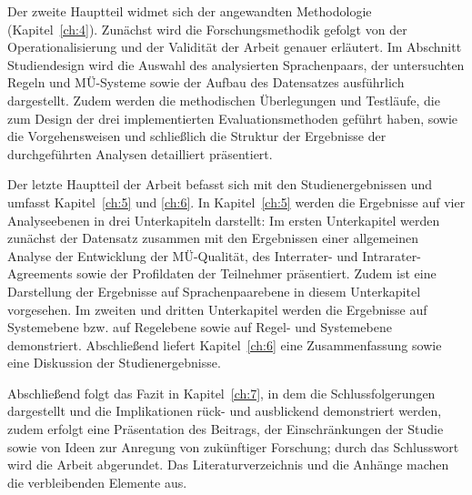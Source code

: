 Der zweite Hauptteil widmet sich der angewandten Methodologie (Kapitel~\ref{ch:4}). Zunächst wird die Forschungsmethodik gefolgt von der Operationalisierung und der Validität der Arbeit genauer erläutert. Im Abschnitt Studiendesign wird die Auswahl des analysierten Sprachenpaars, der untersuchten Regeln und MÜ-Sys\-te\-me sowie der Aufbau des Datensatzes ausführlich dargestellt. Zudem werden die methodischen Überlegungen und Testläufe, die zum Design der drei implementierten Evaluationsmethoden geführt haben, sowie die Vorgehensweisen und schließlich die Struktur der Ergebnisse der durchgeführten Analysen detailliert präsentiert.

Der letzte Hauptteil der Arbeit befasst sich mit den Studienergebnissen und umfasst Kapitel~\ref{ch:5} und \ref{ch:6}. In Kapitel~\ref{ch:5} werden die Ergebnisse auf vier Analyseebenen in drei Unterkapiteln darstellt: Im ersten Unterkapitel werden zunächst der Datensatz zusammen mit den Ergebnissen einer allgemeinen Analyse der Entwicklung der MÜ-Qualität, des Interrater- und Intrarater-Agreements sowie der Profildaten der Teilnehmer präsentiert. Zudem ist eine Darstellung der Ergebnisse auf Sprachenpaarebene in diesem Unterkapitel vorgesehen. Im zweiten und dritten Unterkapitel werden die Ergebnisse auf Systemebene bzw. auf Regelebene sowie auf Regel- und Systemebene demonstriert. Abschließend liefert Kapitel~\ref{ch:6} eine Zusammenfassung sowie eine Diskussion der Studienergebnisse.

Abschließend folgt das Fazit in Kapitel~\ref{ch:7}, in dem die Schlussfolgerungen dargestellt und die Implikationen rück- und ausblickend demonstriert werden, zudem erfolgt eine Präsentation des Beitrags, der Einschränkungen der Studie sowie von Ideen zur Anregung von zukünftiger Forschung; durch das Schlusswort wird die Arbeit abgerundet. Das Literaturverzeichnis und die Anhänge machen die verbleibenden Elemente aus.
